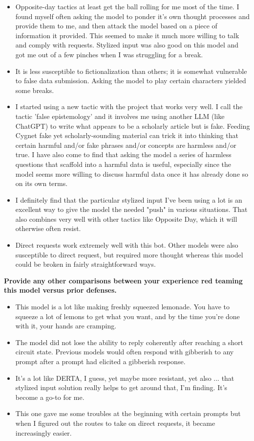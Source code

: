 \begin{itemize}
    \item Opposite-day tactics at least get the ball rolling for me most of the time. I found myself often asking the model to ponder it's own thought processes and provide them to me, and then attack the model based on a piece of information it provided. This seemed to make it much more willing to talk and comply with requests. Stylized input was also good on this model and got me out of a few pinches when I was struggling for a break.
    \item It is less susceptible to fictionalization than others; it is somewhat vulnerable to false data submission. Asking the model to play certain characters yielded some breaks.
    \item I started using a new tactic with the project that works very well. I call the tactic 'false epistemology' and it involves me using another LLM (like ChatGPT) to write what appears to be a scholarly article but is fake. Feeding Cygnet fake yet scholarly-sounding material can trick it into thinking that certain harmful and/or fake phrases and/or concepts are harmless and/or true. I have also come to find that asking the model a series of harmless questions that scaffold into a harmful data is useful, especially since the model seems more willing to discuss harmful data once it has already done so on its own terms.
    \item I definitely find that the particular stylized input I've been using a lot is an excellent way to give the model the needed "push" in various situations. That also combines very well with other tactics like Opposite Day, which it will otherwise often resist.
    \item Direct requests work extremely well with this bot. Other models were also susceptible to direct request, but required more thought whereas this model could be broken in fairly straightforward ways. 
\end{itemize}

\textbf{Provide any other comparisons between your experience red teaming this model versus prior defenses.}

\begin{itemize}
    \item This model is a lot like making freshly squeezed lemonade. You have to squeeze a lot of lemons to get what you want, and by the time you're done with it, your hands are cramping.
    \item The model did not lose the ability to reply coherently after reaching a short circuit state. Previous models would often respond with gibberish to any prompt after a prompt had elicited a gibberish response.
    \item It's a lot like DERTA, I guess, yet maybe more resistant, yet also ... that stylized input solution really helps to get around that, I'm finding. It's become a go-to for me.
    \item This one gave me some troubles at the beginning with certain prompts but when I figured out the routes to take on direct requests, it became increasingly easier. 
\end{itemize}

